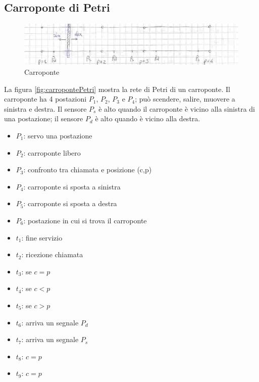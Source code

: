 \documentclass[a4paper]{report}
\begin{document}
\subsection{Carroponte di Petri}
\begin{figure}[!h]
  \begin{center}
    \includegraphics[scale=0.4]{./images/carropontepetri02}
    \caption{Carroponte}\label{fig:carropontePetri02}
  \end{center}
\end{figure} 

La figura \ref{fig:carropontePetri} mostra la rete di Petri di un
carroponte. Il carroponte ha 4 postazioni $P_1$, $P_2$, $P_3$ e
$P_4$; pu\`o scendere, salire, muovere a sinistra e destra. Il
sensore $P_s$ \`e alto quando il carroponte \`e vicino alla 
sinistra di una postazione; il sensore $P_d$ \`e alto quando \`e
vicino alla destra.

\begin{itemize}
\item $P_1$: servo una postazione
\item $P_2$: carroponte libero
\item $P_3$: confronto tra chiamata e posizione (c,p)
\item $P_4$: carroponte si sposta a sinistra
\item $P_5$: carroponte si sposta a destra
\item $P_6$: postazione in cui si trova il carroponte
\item $t_1$: fine servizio
\item $t_2$: ricezione chiamata
\item $t_3$: se $c = p$
\item $t_4$: se $c < p$
\item $t_5$: se $c > p$
\item $t_6$: arriva un segnale $P_d$
\item $t_7$: arriva un segnale $P_s$
\item $t_8$: $c = p$
\item $t_9$: $c = p$
\end{itemize}
\end{document}

